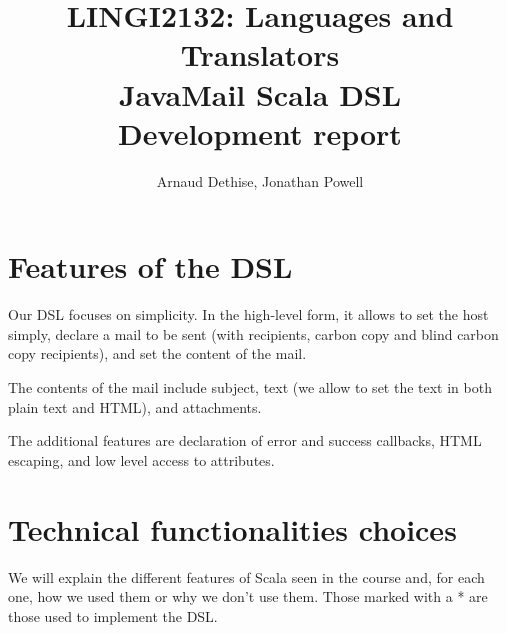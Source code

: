 \documentclass[10pt,a4paper]{article}
\author{Arnaud Dethise, Jonathan Powell}
\title{LINGI2132: Languages and Translators\\
	JavaMail Scala DSL\\
	Development report}
\begin{document}
	
\maketitle

\section{Features of the DSL}

	Our DSL focuses on simplicity. In the high-level form, it allows to set the host simply, declare a mail to be sent (with recipients, carbon copy and blind carbon copy recipients), and set the content of the mail.
	
	The contents of the mail include subject,  text (we allow to set the text in both plain text and HTML), and attachments.
	
	The additional features are declaration of error and success callbacks, HTML escaping, and low level access to attributes.
	
\section{Technical functionalities choices}

	We will explain the different features of Scala seen in the course and, for each one, how we used them or why we don't use them. Those marked with a * are those used to implement the DSL.
\end{document}
